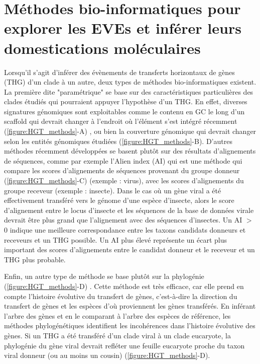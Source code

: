 \chapter{Méthodes bio-informatiques pour explorer les EVEs et inférer leurs domestications moléculaires}
{\hypersetup{linkcolor=GREYDARK}\minitoc}
\label{chap:annexe-methods}


Lorsqu'il s'agit d'inférer des évènements de transferts horizontaux de gènes (THG) d'un clade à un autre, deux types de méthodes bio-informatiques existent. La première  dite "paramétrique" se base sur des caractéristiques particulières des clades étudiés qui pourraient appuyer l'hypothèse d'un THG. En effet, diverses signatures génomiques sont exploitables comme le contenu en GC le long d'un scaffold qui devrait changer à l'endroit où l'élément s'est intégré récemment (\figurename{\ref{figure:HGT_methods}}-A) \citep{ravenhall_inferring_2015}, ou bien la couverture génomique qui devrait changer selon les entités génomiques étudiées (\figurename{\ref{figure:HGT_methods}}-B). D'autres méthodes récemment développées se basent plutôt sur des résultats d'alignements de séquences, comme par exemple l'Alien index (AI) \citep{rancurel_alienness_2017} qui est une méthode qui compare les scores d'alignements de séquences provenant du groupe donneur (\figurename{\ref{figure:HGT_methods}}-C) (exemple : virus), avec les scores d'alignements du groupe receveur (exemple : insecte). Dans le cas où un gène viral a été effectivement transféré vers le génome d'une espèce d'insecte, alors le score d'alignement entre le locus d'insecte et les séquences de la base de données virale devrait être plus grand que l'alignement avec des séquences d’insectes. Un AI $>$ 0 indique une meilleure correspondance entre les taxons candidats donneurs et receveurs et un THG possible. Un AI plus élevé représente un écart plus important des scores d'alignements entre le candidat donneur et le receveur et un THG plus probable.

Enfin, un autre type de méthode se base plutôt sur la phylogénie (\figurename{\ref{figure:HGT_methods}}-D) \citep{ravenhall_inferring_2015}. Cette méthode est très efficace, car elle prend en compte l'histoire évolutive du transfert de gènes, c'est-à-dire la direction du transfert de gènes et les espèces d'où proviennent les gènes transférés. En inférant l'arbre des gènes et en le comparant à l'arbre des espèces de référence, les méthodes phylogénétiques identifient les incohérences dans l'histoire évolutive des gènes. Si un THG a été transféré d'un clade viral à un clade eucaryote, la phylogénie du gène viral devrait refléter une feuille eucaryote proche du taxon viral donneur (ou au moins un cousin) (\figurename{\ref{figure:HGT_methods}}-D). 

